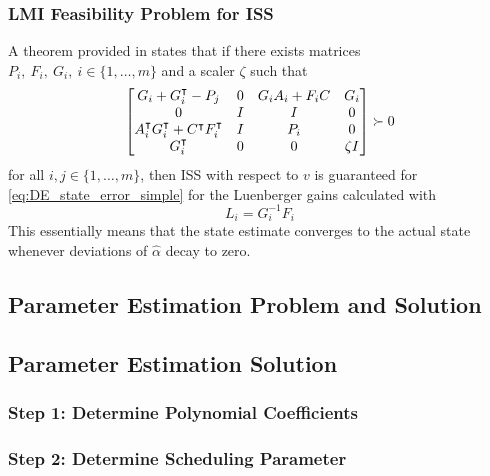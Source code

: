 \documentclass[]{article}
\begin{document}
\subsubsection{LMI Feasibility Problem for ISS}
A theorem provided in \cite{heemels2010} states that if there exists matrices $P_i,\ F_i,\ G_i,\ i \in \{1, \dots, m\}$ and a scaler $\zeta$ such that
\begin{equation}
	\mqty[G_i + G_i^\intercal - P_j			&0	&G_i A_i + F_i C	&G_i\\
		  0							&I	&I					&0\\
		  A_i^\intercal G_i^\intercal + C^\intercal F_i^\intercal	&I	&P_i				&0\\
		  G_i^\intercal						&0	&0					&\zeta I]
		  \succ 0
\end{equation}
for all $i, j \in \{1,\dots,m\}$, then ISS with respect to $v$ is guaranteed for \eqref{eq:DE_state_error_simple} for the Luenberger gains calculated with
\begin{equation}
	L_i = G_i^{-1} F_i
\end{equation}
This essentially means that the state estimate converges to the actual state whenever deviations of $\hat{\alpha}$ decay to zero.

\subsection{Parameter Estimation Problem and Solution}







\subsection{Parameter Estimation Solution}





\subsubsection{Step 1: Determine Polynomial Coefficients}



\subsubsection{Step 2: Determine Scheduling Parameter}
\end{document}
